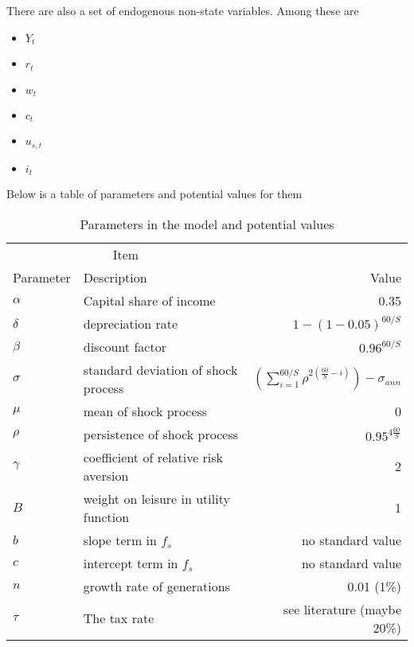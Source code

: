 \documentclass[paper=a4, fontsize=11pt]{scrartcl} %
\numberwithin{figure}{section} %
\numberwithin{table}{section} %
\begin{document}
      There are also a set of endogenous non-state variables. Among these are

      \begin{itemize}
          \item $Y_t$
          \item  $r_t$
          \item $w_t$
          \item $c_t$
          \item $u_{s,t}$
          \item $i_t$
       \end{itemize}

      Below is a table of parameters and potential values for them

      \begin{table}[!htbp]
         \centering
         \begin{tabular}{@{} llr @{}} %
            \toprule
            \multicolumn{2}{c}{Item} \\
            \cmidrule(r){1-2} %
            Parameter    & Description & Value\\
            \midrule
      			$\alpha$    & Capital share of income & 0.35 \\
      			$\delta$     & depreciation rate     &  $1 - (1 - 0.05)^{60/S}$ \\
      			$\beta$      & discount factor  & $0.96^{60/S}$ \\
      			$\sigma$    & standard deviation of shock process  & $(\sum_{i=1}^{60/S} \rho^{2(\frac{60}{S} - i)}) - \sigma_{ann}$ \\
      			$\mu$   	 & mean of shock process  & 0 \\
      			$\rho$        & persistence of shock process& $0.95^{4 \frac{60}{S}}$ \\
      			$\gamma$  & coefficient of relative risk aversion  & 2 \\
      			$B$            & weight on leisure in  utility function & 1 \\
      			$b$       	 & slope term in $f_s$  & no standard value \\
      			$c$      	 & intercept term in $f_s$  & no standard value \\
          			$n$ 		 & growth rate of generations  & 0.01 (1\%) \\
                      $\tau$        & The tax rate & see literature (maybe 20\%) \\
            \bottomrule
         \end{tabular}
         \caption{Parameters in the model and potential values}
         \label{tab:booktabs}
      \end{table}
\end{document}
